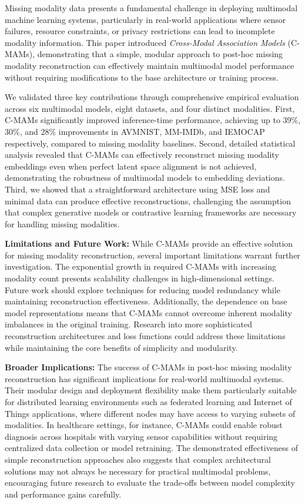 Missing modality data presents a fundamental challenge in deploying multimodal machine learning systems, particularly in real-world applications where sensor failures, resource constraints, or privacy restrictions can lead to incomplete modality information. This paper introduced \textit{Cross-Modal Association Models} (C-MAMs), demonstrating that a simple, modular approach to post-hoc missing modality reconstruction can effectively maintain multimodal model performance without requiring modifications to the base architecture or training process.

We validated three key contributions through comprehensive empirical evaluation across six multimodal models, eight datasets, and four distinct modalities. First, C-MAMs significantly improved inference-time performance, achieving up to 39\%, 30\%, and 28\% improvements in AVMNIST, MM-IMDb, and IEMOCAP respectively, compared to missing modality baselines. Second, detailed statistical analysis revealed that C-MAMs can effectively reconstruct missing modality embeddings even when perfect latent space alignment is not achieved, demonstrating the robustness of multimodal models to embedding deviations. Third, we showed that a straightforward architecture using MSE loss and minimal data can produce effective reconstructions, challenging the assumption that complex generative models or contrastive learning frameworks are necessary for handling missing modalities.

\textbf{Limitations and Future Work:} While C-MAMs provide an effective solution for missing modality reconstruction, several important limitations warrant further investigation. The exponential growth in required C-MAMs with increasing modality count presents scalability challenges in high-dimensional settings. Future work should explore techniques for reducing model redundancy while maintaining reconstruction effectiveness. Additionally, the dependence on base model representations means that C-MAMs cannot overcome inherent modality imbalances in the original training. Research into more sophisticated reconstruction architectures and loss functions could address these limitations while maintaining the core benefits of simplicity and modularity.

\textbf{Broader Implications:} The success of C-MAMs in post-hoc missing modality reconstruction has significant implications for real-world multimodal systems. Their modular design and deployment flexibility make them particularly suitable for distributed learning environments such as federated learning and Internet of Things applications, where different nodes may have access to varying subsets of modalities. In healthcare settings, for instance, C-MAMs could enable robust diagnosis across hospitals with varying sensor capabilities without requiring centralized data collection or model retraining. The demonstrated effectiveness of simple reconstruction approaches also suggests that complex architectural solutions may not always be necessary for practical multimodal problems, encouraging future research to evaluate the trade-offs between model complexity and performance gains carefully.

